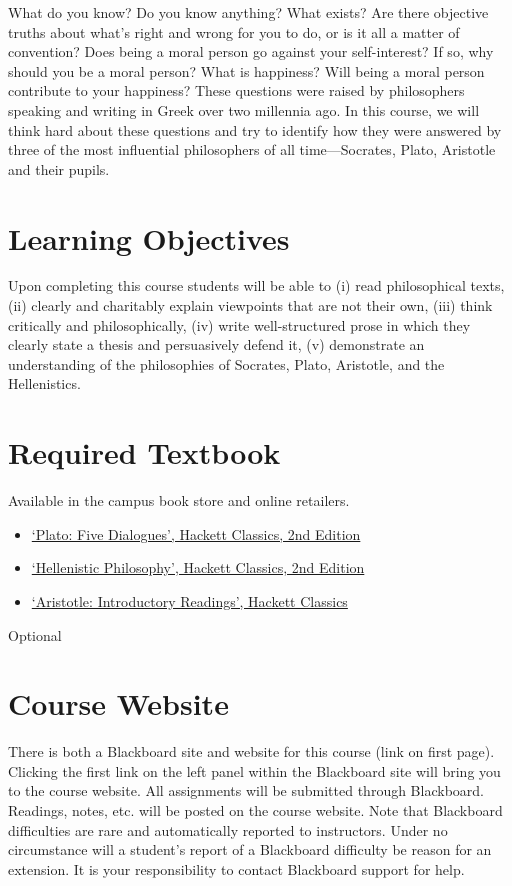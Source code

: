 \documentclass[article,oneside]{memoir}
\begin{document}
What do you know? Do you know anything? What exists? Are there objective truths about what’s right and wrong for you to do, or is it all a matter of convention? Does being a moral person go against your self-interest? If so, why should you be a moral person? What is happiness? Will being a moral person contribute to your happiness? These questions were raised by philosophers speaking and writing in Greek over two millennia ago. In this course, we will think hard about these questions and try to identify how they were answered by three of the most influential philosophers of all time---Socrates, Plato, Aristotle and their pupils. 

\section{Learning Objectives}

Upon completing this course students will be able to (i) read
philosophical texts, (ii) clearly and charitably explain viewpoints that
are not their own, (iii) think critically and philosophically, (iv)
write well-structured prose in which they clearly state a thesis and
persuasively defend it, (v) demonstrate an understanding of the
philosophies of Socrates, Plato, Aristotle, and the Hellenistics.


\section{Required Textbook}
Available in the campus book store and online retailers.
\begin{itemize}
\item \href{http://www.amazon.com/Plato-Dialogues-Euthyphro-Apology-Classics/dp/0872206335/ref=sr_1_1?ie=UTF8&qid=1452099006&sr=8-1&keywords=plato+five+dialogues}{`Plato: Five Dialogues', Hackett Classics, 2nd Edition}
\item \href{http://www.amazon.com/Hellenistic-Philosophy-Hackett-Classics-Inwood/dp/0872203786/ref=sr_1_1?ie=UTF8&qid=1452099186&sr=8-1&keywords=hellenistic+philosophy}{`Hellenistic Philosophy', Hackett Classics, 2nd Edition}
\item \href{http://www.amazon.com/Aristotle-Introductory-Readings-Hackett-Classics/dp/0872203395/ref=sr_1_1?ie=UTF8&qid=1452102830&sr=8-1&keywords=aristotle+hackett}{`Aristotle: Introductory Readings', Hackett Classics}
\end{itemize}
Optional

\section{Course Website}
There is both a Blackboard site and website for this course (link on first page). Clicking the first link on the left panel within the Blackboard site will bring you to the course website. All assignments will be submitted through Blackboard. Readings, notes, etc. will be posted on the course website. Note that Blackboard difficulties are rare and automatically reported to instructors. Under no circumstance will a student's report of a Blackboard difficulty be reason for an extension. It is your responsibility to contact Blackboard support for help.
\end{document}
